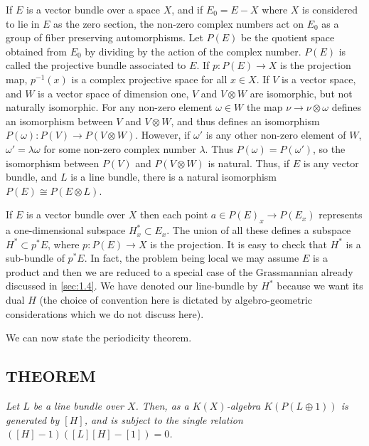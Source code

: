 If $E$ is a vector bundle over a space $X$, and if $E_0 = E - X$ where $X$ is considered to lie in $E$ as the zero section, the non-zero complex numbers act on $E_0$ as a group of fiber preserving automorphisms. Let $P(E)$ be the quotient space obtained from $E_0$ by dividing by the action of the complex number. $P(E)$ is called the projective bundle associated to $E$. If $p: P(E) \to X$ is the projection map, $p^{-1}(x)$ is a complex projective space for all $x \in X$. If $V$ is a vector space, and $W$ is a vector space of dimension one, $V$ and $V \otimes W$ are isomorphic, but not naturally isomorphic. For any non-zero element $\omega \in W$ the map $\nu \to \nu \otimes \omega$ defines an isomorphism between $V$ and $V \otimes W$, and thus defines an isomorphism $P(\omega): P(V) \to P(V \otimes W)$. However, if $\omega'$ is any other non-zero element of $W$, $\omega' = \lambda \omega$ for some non-zero complex number $\lambda$. Thus $P(\omega) = P(\omega')$, so the isomorphism between $P(V)$ and $P(V \otimes W)$ is natural. Thus, if $E$ is any vector bundle, and $L$ is a line bundle, there is a natural isomorphism $P(E) \cong P(E \otimes L)$. \par 

If $E$ is a vector bundle over $X$ then each point $a \in P(E)_x \to P(E_x)$ represents a one-dimensional subspace $H^*_x \subset E_x$. The union of all these defines a subspace $H^* \subset p^*E$, where $p: P(E) \to X$ is the projection. It is easy to check that $H^*$ is a sub-bundle of $p^*E$. In fact, the problem being local we may assume $E$ is a product and then we are reduced to a special case of the Grassmannian already discussed in \cref{sec:1.4}. We have denoted our line-bundle by $H^*$ because we want its dual $H$ (the choice of convention here is dictated by algebro-geometric considerations which we do not discuss here). \par 

We can now state the periodicity theorem. \par 

\subsection{THEOREM}\label{the:2.2.1} \textit{Let $L$ be a line bundle over $X$. Then, as a $K(X)$-algebra $K(P(L \oplus 1))$ is generated by $[H]$, and is subject to the single relation \linebreak $([H] - 1)([L][H] - [1]) = 0$.} \par 

